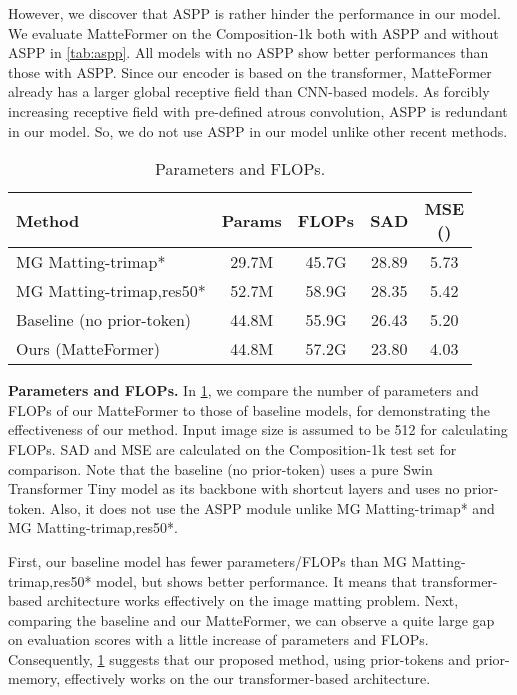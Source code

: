 \documentclass[10pt,twocolumn,letterpaper]{article}
\begin{document}
However, we discover that ASPP is rather hinder the performance in our model. We evaluate MatteFormer on the Composition-1k both with ASPP and without ASPP in \cref{tab:aspp}. All models with no ASPP show better performances than those with ASPP. Since our encoder is based on the transformer, MatteFormer already has a larger global receptive field than CNN-based models. As forcibly increasing receptive field with pre-defined atrous convolution, ASPP is redundant in our model. So, we do not use ASPP in our model unlike other recent methods. 



\begin{table}
  \centering
  \begin{adjustbox}{width = \linewidth}
  \begin{tabular}{l | c c c c}
    \toprule
    Method & Params & FLOPs & SAD & \makecell{MSE \\ ()}\\
    \midrule
    MG Matting-trimap* & 29.7M & 45.7G & 28.89 & 5.73 \\
    MG Matting-trimap,res50* & 52.7M & 58.9G & 28.35 & 5.42 \\
    \midrule
    Baseline (no prior-token) & 44.8M & 55.9G & 26.43 & 5.20 \\
    \hline
    Ours (MatteFormer) & 44.8M & 57.2G & 23.80 & 4.03 \\
    \bottomrule
  \end{tabular}
  \end{adjustbox}
  \caption{Parameters and FLOPs. }
  \label{tab:paramflop}
  \vspace{-2mm}
\end{table}

\vspace{2mm}
\textbf{Parameters and FLOPs.}
In \cref{tab:paramflop}, we compare the number of parameters and FLOPs of our MatteFormer to those of baseline models, for demonstrating the effectiveness of our method. Input image size is assumed to be 512 for calculating FLOPs. SAD and MSE are calculated on the Composition-1k test set for comparison.
Note that the baseline (no prior-token) uses a pure Swin Transformer Tiny model as its backbone with shortcut layers and uses no prior-token. Also, it does not use the ASPP module unlike MG Matting-trimap* and MG Matting-trimap,res50*.

First, our baseline model has fewer parameters/FLOPs than MG Matting-trimap,res50* model, but shows better performance. It means that transformer-based architecture works effectively on the image matting problem. 
Next, comparing the baseline and our MatteFormer, we can observe a quite large gap on evaluation scores with a little increase of parameters and FLOPs. Consequently, \cref{tab:paramflop} suggests that our proposed method, using prior-tokens and prior-memory, effectively works on the our transformer-based architecture.
\end{document}
